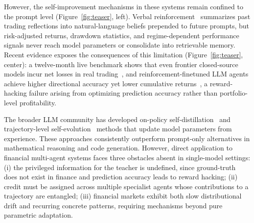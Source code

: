 However, the self-improvement mechanisms in these systems remain confined to the prompt level (Figure~\ref{fig:teaser}, left). Verbal reinforcement~\cite{reflexion2023} summarizes past trading reflections into natural-language beliefs prepended to future prompts, but risk-adjusted returns, drawdown statistics, and regime-dependent performance signals never reach model parameters or consolidate into retrievable memory. Recent evidence exposes the consequences of this limitation (Figure~\ref{fig:teaser}, center): a twelve-month live benchmark shows that even frontier closed-source models incur net losses in real trading~\cite{deepfund2025}, and reinforcement-finetuned LLM agents achieve higher directional accuracy yet lower cumulative returns~\cite{losingwinner2025}, a reward-hacking failure arising from optimizing prediction accuracy rather than portfolio-level profitability.


The broader LLM community has developed on-policy self-distillation~\cite{opsd2026,gkd2024} and trajectory-level self-evolution~\cite{seagent2025,seea2025} methods that update model parameters from experience. These approaches consistently outperform prompt-only alternatives in mathematical reasoning and code generation. However, direct application to financial multi-agent systems faces three obstacles absent in single-model settings: (i) the privileged information for the teacher is undefined, since ground-truth does not exist in finance and prediction accuracy leads to reward hacking; (ii) credit must be assigned across multiple specialist agents whose contributions to a trajectory are entangled; (iii) financial markets exhibit both slow distributional drift and recurring concrete patterns, requiring mechanisms beyond pure parametric adaptation.

